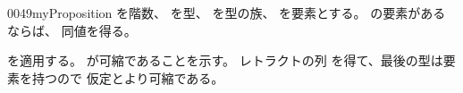 \documentclass[index]{subfiles}
\begin{document}
\begin{myBlock}{0049}{myProposition}
  を階数、
  を型、
  を型の族、
  を要素とする。
  の要素があるならば、
  同値を得る。
\end{myBlock}
\StartDefiningTabulars
\begin{myProof}
  を適用する。
  が可縮であることを示す。
  レトラクトの列
  を得て、最後の型は要素を持つので
  仮定とより可縮である。
\end{myProof}
\StopDefiningTabulars
\end{document}

